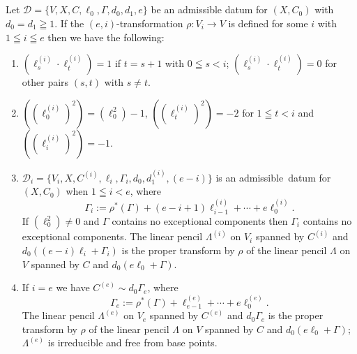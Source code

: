 \subsection{}\label{chap2:1.7}
\begin{lemma*}
  Let $\mathscr{D}=\{V,X,C,\ell_{0},\Gamma,d_{0},d_{1},e\}$ be an
  admissible datum for $(X,C_{0})$ with $d_{0}=d_{1}\geqq 1$. If the
  $(e,i)$-transformation $\rho:V_{i}\to V$ is defined for some $i$ with
  $1\leqq i\leqq e$ then we have the following:
  \begin{enumerate}
    \renewcommand{\labelenumi}{\rm(\theenumi)}
  \item $(\ell_{s}^{(i)}\cdot \ell^{(i)}_{t})=1$ if $t=s+1$ with $0\leqq
    s<i$; $(\ell^{(i)}_{s}\cdot \ell^{(i)}_{t})=0$ for other pairs
    $(s,t)$ with $s\neq t$.
    
  \item $((\ell^{(i)}_{0})^{2})=(\ell^{2}_{0})-1$,
    $((\ell^{(i)}_{t})^{2})=-2$ for $1\leqq t<i$ and
    $((\ell^{(i)}_{i})^{2})=-1$.
    
  \item
    $\mathscr{D}_{i}=\{V_{i},X,C^{(i)},\ell_{i},\Gamma_{i},d_{0},d^{(i)}_{1},(e-i)\}$
    is an admissible\pageoriginale\ datum for $(X,C_{0})$ when $1\leqq
    i<e$, where
    $$
    \Gamma_{i}:=\rho^{\ast}(\Gamma)+(e-i+1)\ell^{(i)}_{i-1}+\cdots+e\ell_{0}^{(i)}.
    $$
    If $(\ell^{2}_{0})\neq 0$ and $\Gamma$ contains no exceptional
    components then $\Gamma_{i}$ contains no exceptional components. The
    linear pencil $\Lambda^{(i)}$ on $V_{i}$ spanned by $C^{(i)}$ and
    $d_{0}((e-i)\ell_{i}+\Gamma_{i})$ is the proper transform by $\rho$ of
    the linear pencil $\Lambda$ on $V$ spanned by $C$ and
    $d_{0}(e\ell_{0}+\Gamma)$. 
    
  \item If $i=e$ we have $C^{(e)}\sim d_{0}\Gamma_{e}$, where
    $$
    \Gamma_{e}:=\rho^{\ast}(\Gamma)+\ell^{(e)}_{e-1}+\cdots+e\ell_{0}^{(e)}.
    $$
    The linear pencil $\Lambda^{(e)}$ on $V_{e}$ spanned by $C^{(e)}$ and
    $d_{0}\Gamma_{e}$ is the proper transform by $\rho$ of the linear
    pencil $\Lambda$ on $V$ spanned by $C$ and $d_{0}(e\ell_{0}+\Gamma)$;
    $\Lambda^{(e)}$ is irreducible and free from base points.
  \end{enumerate}
\end{lemma*}

